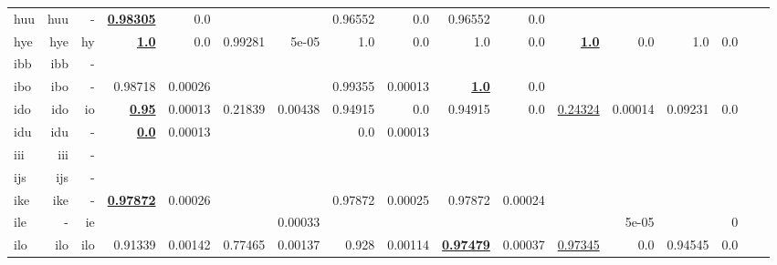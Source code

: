 \documentclass[11pt]{article}
\begin{document}
\begin{table*}[h]
{\begin{tabular}{lrrrrrrrrrrrrrrrr}
huu         & huu         & -         & \textbf{\underline{0.98305}}         & 0.0         &          &          & 0.96552         & 0.0         & 0.96552         & 0.0         &          &          &          &          \\
hye         & hye         & hy         & \textbf{\underline{1.0}}         & 0.0         & 0.99281         & 5e-05         & 1.0         & 0.0         & 1.0         & 0.0         & \textbf{\underline{1.0}}         & 0.0         & 1.0         & 0.0         \\
ibb         & ibb         & -         &          &          &          &          &          &          &          &          &          &          &          &          \\
ibo         & ibo         & -         & 0.98718         & 0.00026         &          &          & 0.99355         & 0.00013         & \textbf{\underline{1.0}}         & 0.0         &          &          &          &          \\
ido         & ido         & io         & \textbf{\underline{0.95}}         & 0.00013         & 0.21839         & 0.00438         & 0.94915         & 0.0         & 0.94915         & 0.0         & \underline{0.24324}         & 0.00014         & 0.09231         & 0.0         \\
idu         & idu         & -         & \textbf{\underline{0.0}}         & 0.00013         &          &          & 0.0         & 0.00013         &          &          &          &          &          &          \\
iii         & iii         & -         &          &          &          &          &          &          &          &          &          &          &          &          \\
ijs         & ijs         & -         &          &          &          &          &          &          &          &          &          &          &          &          \\
ike         & ike         & -         & \textbf{\underline{0.97872}}         & 0.00026         &          &          & 0.97872         & 0.00025         & 0.97872         & 0.00024         &          &          &          &          \\
ile         & -         & ie         &          &          &          & 0.00033         &          &          &          &          &          & 5e-05         &          & 0         \\
ilo         & ilo         & ilo         & 0.91339         & 0.00142         & 0.77465         & 0.00137         & 0.928         & 0.00114         & \textbf{\underline{0.97479}}         & 0.00037         & \underline{0.97345}         & 0.0         & 0.94545         & 0.0         \\

\end{tabular}}
\end{table*}
\end{document}
